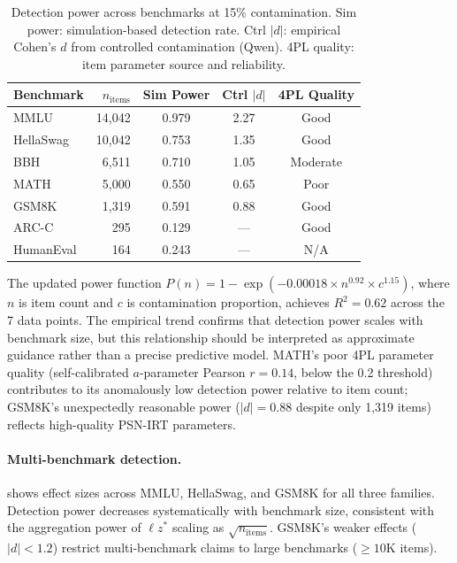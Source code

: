 \documentclass[11pt,a4paper]{article}
\begin{document}
\begin{table}[t]
\centering
\caption{Detection power across benchmarks at 15\% contamination. Sim power: simulation-based detection rate. Ctrl $|d|$: empirical Cohen's $d$ from controlled contamination (Qwen). 4PL quality: item parameter source and reliability.}
\label{tab:power}
\small
\begin{tabular}{lrccc}
\toprule
\textbf{Benchmark} & $n_{\text{items}}$ & \textbf{Sim Power} & \textbf{Ctrl} $|d|$ & \textbf{4PL Quality} \\
\midrule
MMLU & 14,042 & 0.979 & 2.27 & Good \\
HellaSwag & 10,042 & 0.753 & 1.35 & Good \\
BBH & 6,511 & 0.710 & 1.05 & Moderate \\
MATH & 5,000 & 0.550 & 0.65 & Poor \\
GSM8K & 1,319 & 0.591 & 0.88 & Good \\
ARC-C & 295 & 0.129 & --- & Good \\
HumanEval & 164 & 0.243 & --- & N/A \\
\bottomrule
\end{tabular}
\end{table}

The updated power function $P(n) = 1 - \exp(-0.00018 \times n^{0.92} \times c^{1.15})$, where $n$ is item count and $c$ is contamination proportion, achieves $R^2{=}0.62$ across the 7 data points.
The empirical trend confirms that detection power scales with benchmark size, but this relationship should be interpreted as approximate guidance rather than a precise predictive model.
MATH's poor 4PL parameter quality (self-calibrated $a$-parameter Pearson $r{=}0.14$, below the 0.2 threshold) contributes to its anomalously low detection power relative to item count; GSM8K's unexpectedly reasonable power ($|d|{=}0.88$ despite only 1,319 items) reflects high-quality PSN-IRT parameters.

\paragraph{Multi-benchmark detection.}
 shows effect sizes across MMLU, HellaSwag, and GSM8K for all three families.
Detection power decreases systematically with benchmark size, consistent with the aggregation power of $\ell z^*$ scaling as $\sqrt{n_{\text{items}}}$.
GSM8K's weaker effects ($|d|{<}1.2$) restrict multi-benchmark claims to large benchmarks (${\geq}10$K items).
\end{document}
